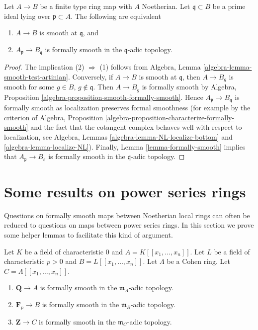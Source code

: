 \begin{lemma}
\label{lemma-formally-smooth-finite-type}
Let $A \to B$ be a finite type ring map with $A$ Noetherian.
Let $\mathfrak q \subset B$ be a prime ideal lying over
$\mathfrak p \subset A$. The following are equivalent
\begin{enumerate}
\item $A \to B$ is smooth at $\mathfrak q$, and
\item $A_\mathfrak p \to B_\mathfrak q$ is formally smooth in
the $\mathfrak q$-adic topology.
\end{enumerate}
\end{lemma}

\begin{proof}
The implication (2) $\Rightarrow$ (1) follows from
Algebra, Lemma \ref{algebra-lemma-smooth-test-artinian}.
Conversely, if $A \to B$ is smooth at $\mathfrak q$, then
$A \to B_g$ is smooth for some $g \in B$, $g \not \in \mathfrak q$.
Then $A \to B_g$ is formally smooth by
Algebra, Proposition \ref{algebra-proposition-smooth-formally-smooth}.
Hence $A_\mathfrak p \to B_\mathfrak q$ is formally smooth
as localization preserves formal smoothness (for example by
the criterion of Algebra, Proposition
\ref{algebra-proposition-characterize-formally-smooth}
and the fact that the cotangent complex behaves well with respect to
localization, see
Algebra, Lemmas \ref{algebra-lemma-NL-localize-bottom} and
\ref{algebra-lemma-localize-NL}).
Finally, Lemma \ref{lemma-formally-smooth} implies that
$A_\mathfrak p \to B_\mathfrak q$ is formally smooth in the
$\mathfrak q$-adic topology.
\end{proof}









\section{Some results on power series rings}
\label{section-power-series}

\noindent
Questions on formally smooth maps between Noetherian local rings
can often be reduced to questions on maps between power series
rings. In this section we prove some helper lemmas to facilitate
this kind of argument.

\begin{lemma}
\label{lemma-power-series-ring-over-Cohen-fs}
Let $K$ be a field of characteristic $0$ and $A = K[[x_1, \ldots, x_n]]$.
Let $L$ be a field of characteristic $p > 0$ and $B = L[[x_1, \ldots, x_n]]$.
Let $\Lambda$ be a Cohen ring. Let $C = \Lambda[[x_1, \ldots, x_n]]$.
\begin{enumerate}
\item $\mathbf{Q} \to A$ is formally smooth in the 
$\mathfrak m_A$-adic topology.
\item $\mathbf{F}_p \to B$ is formally smooth in the 
$\mathfrak m_B$-adic topology.
\item $\mathbf{Z} \to C$ is formally smooth in the
$\mathfrak m_C$-adic topology.
\end{enumerate}
\end{lemma}

